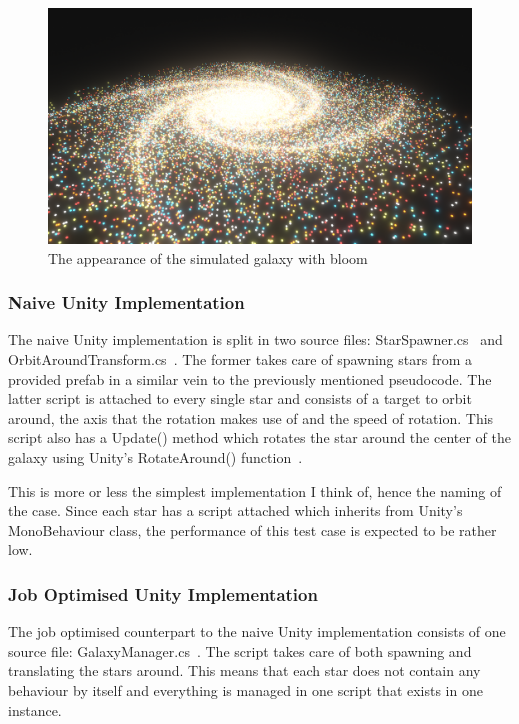 \begin{figure}[tbph]
    \centering
    \includegraphics[width=1\textwidth]{Figures/bloom.png}
    \caption[Galaxy with bloom]{The appearance of the simulated galaxy with bloom}
    \label{fig:bloom}
\end{figure}

\subsubsection{Naive Unity Implementation}
The naive Unity implementation is split in two source files: StarSpawner.cs~\cite{naiveSpawner} and OrbitAroundTransform.cs~\cite{naiveOrbiter}. The former takes care of spawning stars from a provided prefab in a similar vein to the previously mentioned pseudocode. The latter script is attached to every single star and consists of a target to orbit around, the axis that the rotation makes use of and the speed of rotation. This script also has a Update() method which rotates the star around the center of the galaxy using Unity's RotateAround() function~\cite{rotateAroundFunction}.

This is more or less the simplest implementation I think of, hence the naming of the case. Since each star has a script attached which inherits from Unity's MonoBehaviour class, the performance of this test case is expected to be rather low.

\subsubsection{Job Optimised Unity Implementation}
The job optimised counterpart to the naive Unity implementation consists of one source file: GalaxyManager.cs~\cite{jobOptimizedManager}. The script takes care of both spawning and translating the stars around. This means that each star does not contain any behaviour by itself and everything is managed in one script that exists in one instance. 

